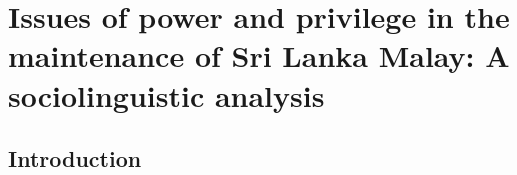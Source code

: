 

\chapter[Power and privilege in SLM maintenance]{Issues of power and privilege in the maintenance of Sri Lanka Malay: A sociolinguistic analysis}

% 
% 

\section{Introduction}\label{rassool:sec:1}

